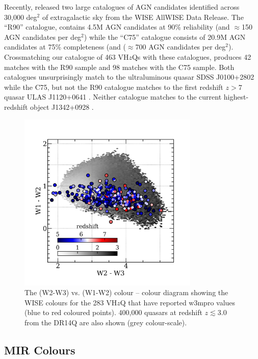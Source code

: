 \documentclass[usenatbib]{mnras}
\begin{document}
Recently, \citet{Assef2018} released two large catalogues of AGN
candidates identified across 30,000 deg$^2$ of extragalactic sky from
the WISE AllWISE Data Release. The ``R90'' catalogue, contains 4.5M
AGN candidates at 90\% reliability (and $\approx$150 AGN candidates
per deg$^2$) while the ``C75'' catalogue consists of 20.9M AGN
candidates at 75\% completeness (and ($\approx$700 AGN candidates per
deg$^2$). Crossmatching our catalogue of 463 VH$z$Qs with these
catalogues, produces 42 matches with the R90 sample and 98 matches
with the C75 sample. Both catalogues unsurprisingly match to the
ultraluminous quasar SDSS J0100+2802 \citep{Wu2015} while the C75, but
not the R90 catalogue matches to the first redshift $z>7$ quasar ULAS
J1120+0641 \citep{Mortlock2011}. Neither catalogue matches to the
current highest-redshift object J1342+0928 \citep{Banados2018}.


\begin{figure}
    \centering
    \includegraphics[width=8.6cm,  clip, trim=6mm 4mm 6mm 10mm]
    {../color_color/W1W2_plots/W1W2W3/W1W2W3_hexplots_20190610v2.png} 
  \vspace{-14pt}
    \caption{The (W2-W3) vs. (W1-W2) colour – colour diagram showing the WISE colours 
      for the 283 VH$z$Q that have reported w3mpro values (blue to red coloured points).
      400,000 quasars at redshift $z\lesssim3.0$ from the DR14Q are also shown
      (grey colour-scale). }
    \label{fig:W1W2W3}
\end{figure}
\subsection{MIR Colours}
%
\citet{LaMassa2017, Glikman2018, LaMassa2019} 
%
\end{document}
